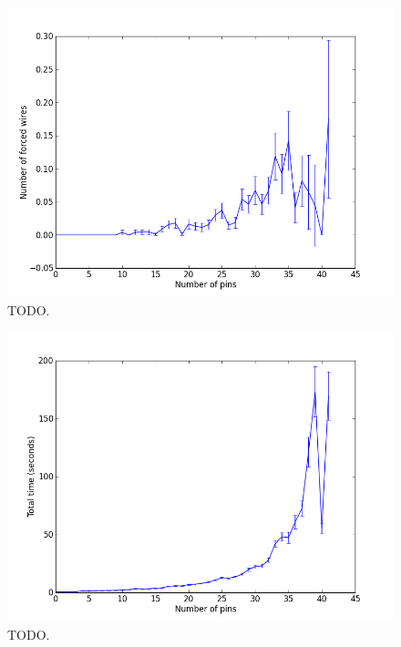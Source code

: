 \begin{figure}[H]
\begin{center}
\includegraphics[width=\textwidth]{Images/final_algorithm_num_forced_wires.png}
\caption{TODO.}
\label{fig:final_num_forced_wires}
\end{center}
\end{figure}

\begin{figure}[H]
\begin{center}
\includegraphics[width=\textwidth]{Images/final_algorithm_time_trend.png}
\caption{TODO.}
\label{fig:final_time_trend}
\end{center}
\end{figure}

